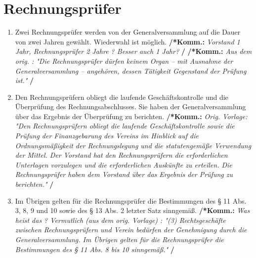 \documentclass[a4paper,12pt]{article}
\newcommand{\comment}[1]{{\bf /*Komm.:} \textit{#1} {\bf */}}
\begin{document}
\section{Rechnungsprüfer} %
\begin{enumerate}

\item Zwei Rechnungsprüfer werden von der Generalversammlung auf die Dauer von zwei Jahren gewählt. Wiederwahl ist möglich.
\comment{Vorstand 1 Jahr, Rechnungsprüfer 2 Jahre ? Besser auch 1 Jahr?}
\comment{Aus dem orig. : "Die Rechnungsprüfer dürfen keinem Organ – mit Ausnahme der Generalversammlung – angehören, dessen Tätigkeit Gegenstand der Prüfung ist."}

\item Den Rechnungsprüfern obliegt die laufende Geschäftskontrolle und die Überprüfung des Rechnungsabschlusses. Sie haben der Generalversammlung über das Ergebnis der Überprüfung zu berichten.
\comment{Orig. Vorlage: "Den Rechnungsprüfern obliegt die laufende Geschäftskontrolle sowie die Prüfung der Finanzgebarung des Vereins im Hinblick auf die Ordnungsmäßigkeit der Rechnungslegung und die statutengemäße Verwendung der Mittel. Der Vorstand hat den Rechnungsprüfern die erforderlichen Unterlagen vorzulegen und die erforderlichen Auskünfte zu erteilen. Die Rechnungsprüfer haben dem Vorstand über das Ergebnis der Prüfung zu berichten."}

\item Im Übrigen gelten für die Rechnungsprüfer die Bestimmungen des § 11 Abs. 3, 8, 9 und 10 sowie des § 13 Abs. 2 letzter Satz sinngemäß.
\comment{Was heist das ? Vermutlich (aus dem orig. Vorlage) : "(3) Rechtsgeschäfte zwischen Rechnungsprüfern und Verein bedürfen der Genehmigung durch die Generalversammlung. Im Übrigen gelten für die Rechnungsprüfer die Bestimmungen des § 11 Abs. 8 bis 10 sinngemäß."}

\end{enumerate}
\end{document}
